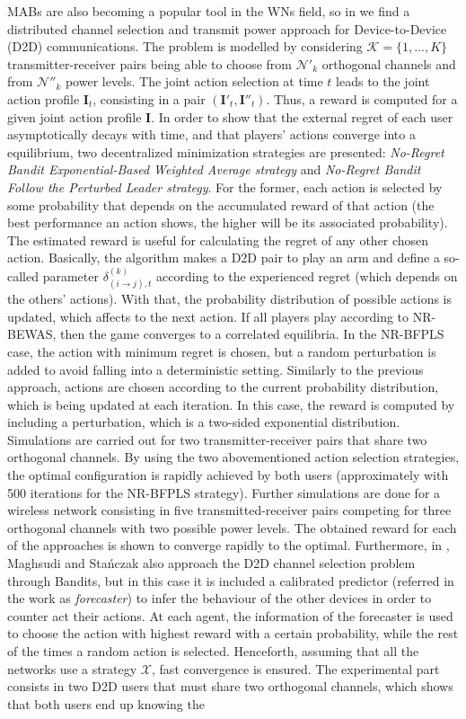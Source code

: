 \documentclass[12pt, a4paper,twoside]{tesi_upf}
\begin{document}
				MABs are also becoming a popular tool in the WNs field, so in \cite{maghsudi2015joint} we find a distributed channel selection and transmit power approach for Device-to-Device (D2D) communications. The problem is modelled by considering $\mathcal{K}=\{1,...,K\}$ transmitter-receiver pairs being able to choose from $\mathcal{N}'_k$ orthogonal channels and from $\mathcal{N}''_k$ power levels. The joint action selection at time $t$ leads to the joint action profile $\textbf{I}_t$, consisting in a pair $(\textbf{I}'_t,\textbf{I}''_t)$. Thus, a reward is computed for a given joint action profile \textbf{I}. In order to show that the external regret of each user asymptotically decays with time, and that players’ actions converge into a equilibrium, two decentralized minimization strategies are presented: \textit{No-Regret Bandit Exponential-Based Weighted Average strategy} and \textit{No-Regret Bandit Follow the Perturbed Leader strategy}. For the former, each action is selected by some probability that depends on the accumulated reward of that action (the best performance an action shows, the higher will be its associated probability). The estimated reward is useful for calculating the regret of any other chosen action. Basically, the algorithm makes a D2D pair to play an arm and define a so-called parameter $\delta_{(i \rightarrow j),t}^{(k)}$ according to the experienced regret (which depends on the others' actions). With that, the probability distribution of possible actions is updated, which affects to the next action. If all players play according to NR-BEWAS, then the game converges to a correlated equilibria. In the NR-BFPLS case, the action with minimum regret is chosen, but a random perturbation is added to avoid falling into a deterministic setting. Similarly to the previous approach, actions are chosen according to the current probability distribution, which is being updated at each iteration. In this case, the reward is computed by including a perturbation, which is a two-sided exponential distribution. Simulations are carried out for two transmitter-receiver pairs that share two orthogonal channels. By using the two abovementioned action selection strategies, the optimal configuration is rapidly achieved by both users (approximately with 500 iterations for the NR-BFPLS strategy). Further simulations are done for a wireless network consisting in five transmitted-receiver pairs competing for three orthogonal channels with two possible power levels. The obtained reward for each of the approaches is shown to converge rapidly to the optimal. Furthermore, in \cite{maghsudi2015channel},  Maghsudi and Sta{\'n}czak also approach the D2D channel selection problem through Bandits, but in this case it is included a calibrated predictor (referred in the work as \textit{forecaster}) to infer the behaviour of the other devices in order to counter act their actions. At each agent, the information of the forecaster is used to choose the action with highest reward with a certain probability, while the rest of the times a random action is selected. Henceforth, assuming that all the networks use a strategy $\mathcal{X}$, fast convergence is ensured. The experimental part consists in two D2D users that must share two orthogonal channels, which shows that both users end up knowing the 
\end{document}
